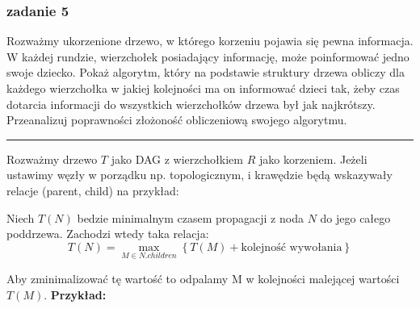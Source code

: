 \documentclass[11pt,a4paper]{article}
\begin{document}
\subsubsection{zadanie 5}
Rozważmy ukorzenione drzewo, w którego korzeniu pojawia się pewna informacja. W każdej rundzie, wierzchołek posiadający informację, może poinformować jedno swoje dziecko. Pokaż algorytm, który na podstawie struktury drzewa obliczy dla każdego wierzchołka w jakiej kolejności ma on informować dzieci tak, żeby czas dotarcia informacji do wszystkich wierzchołków drzewa był jak najkrótszy. Przeanalizuj poprawności złożoność obliczeniową swojego algorytmu.

\bigskip
\hrule
\bigskip

Rozważmy drzewo $T$ jako DAG z wierzchołkiem $R$ jako korzeniem. Jeżeli ustawimy węzły w porządku np. topologicznym, i krawędzie będą wskazywały relacje (parent, child) na przykład:
\begin{center}\end{center}

Niech $T(N)$ bedzie minimalnym czasem propagacji z noda $N$ do jego całego poddrzewa. Zachodzi wtedy taka relacja:
\[
    T(N) = \max_{M \in N.children} \left\{ T(M) + \text{kolejność wywołania} \right\}
\]

Aby zminimalizować tę wartość to odpalamy M w kolejności malejącej wartości $T(M)$.
\textbf{Przykład:}
\end{document}
